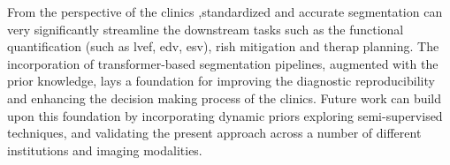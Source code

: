 From the perspective of the clinics ,standardized and accurate segmentation can very significantly streamline the downstream tasks such as the functional quantification (such as \gls{lvef}, \gls{edv}, \gls{esv}), rish mitigation and therap planning. The incorporation of transformer-based segmentation pipelines, augmented with the prior knowledge, lays a foundation for improving the diagnostic reproducibility and enhancing the decision making process of the clinics. Future work can build upon this foundation by incorporating dynamic priors exploring semi-supervised techniques, and validating the present approach across a number of different institutions and imaging modalities.
